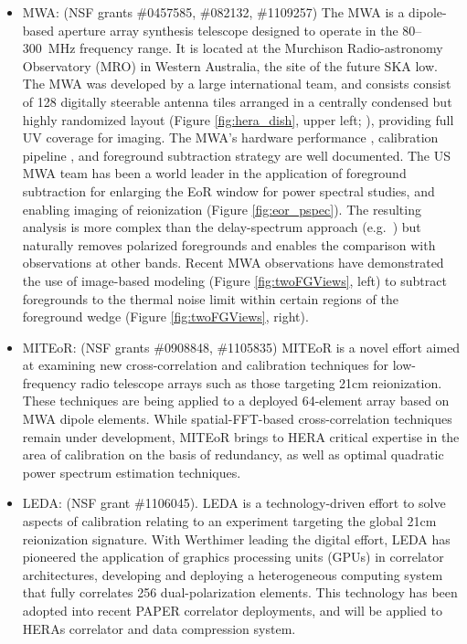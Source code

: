 \documentclass[preprint]{aastex}
\begin{document}
\begin{itemize}[noitemsep,nolistsep]
\item{MWA:} (NSF grants \#0457585, \#082132, \#1109257) 
The MWA is a dipole-based aperture array synthesis telescope designed
to operate in the 80--300~MHz frequency range.
It is located at the
Murchison Radio-astronomy Observatory (MRO) in Western Australia, the
site of the future SKA low. The MWA was developed by a large international team, and consists
consist of 128 digitally steerable antenna tiles arranged in a centrally
condensed but highly randomized layout (Figure \ref{fig:hera_dish}, upper left;
\citealt{tingay_et_al2013_trunc}), providing full UV coverage for imaging.
The MWA's hardware performance \citep{bowman_et_al2007a}, calibration pipeline
\citep{mitchell_et_al2008}, and foreground subtraction strategy \citep{morales_et_al2006a}
are well documented. The US MWA team has been a world leader in the application of 
foreground subtraction for enlarging the EoR window for power spectral studies, 
and enabling imaging of reionization (Figure
\ref{fig:eor_pspec}). The resulting analysis is more complex than the
delay-spectrum approach (e.g.\ \citealt{hazelton_et_al2013}) but naturally
removes polarized foregrounds \citep{moore_et_al2013} and enables the
comparison with observations at other bands. Recent MWA observations have
demonstrated the use of image-based modeling (Figure \ref{fig:twoFGViews}, left) to
subtract foregrounds to the thermal noise limit within certain regions of the foreground wedge 
(Figure \ref{fig:twoFGViews}, right). %

\item{MITEoR:} (NSF grants \#0908848, \#1105835) MITEoR is a novel effort aimed at
examining new cross-correlation and calibration techniques for low-frequency radio telescope
arrays such as those targeting 21cm reionization.  These techniques are being applied
to a deployed 64-element array based on MWA dipole elements.  While spatial-FFT-based cross-correlation
techniques remain under development, MITEoR brings to HERA critical expertise in the area
of calibration on the basis of redundancy, as well as optimal quadratic power spectrum estimation techniques.

\item{LEDA:} (NSF grant \#1106045). LEDA is a technology-driven effort to solve aspects of calibration relating
to an experiment targeting the global 21cm reionization signature.  With Werthimer leading the digital effort,
LEDA has pioneered the application of graphics processing units (GPUs) in correlator architectures, developing
and deploying a heterogeneous computing system that fully correlates 256 dual-polarization elements.  This
technology has been adopted into recent PAPER correlator deployments, and will be applied to HERAs correlator
and data compression system.

\end{itemize}
\end{document}
